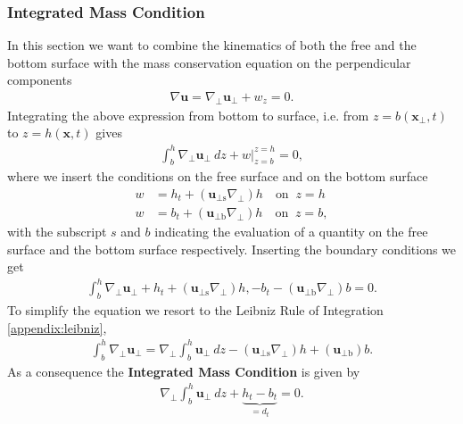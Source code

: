 \subsubsection{Integrated Mass Condition}
In this section we want to combine the kinematics of both the free and the
bottom surface with the mass conservation equation on the perpendicular
components
\begin{align}
    \nabla \mathbf{u} = \nabla_\perp \mathbf{u}_\perp + w_z = 0 .
\end{align}
Integrating the above expression from bottom to surface, i.e. from
$z=b(\mathbf{x}_\perp,t)$ to $z = h (\mathbf{x},t)$ gives
\begin{align}
    \int_b^h \nabla_\perp \mathbf{u}_\perp\ dz + w\bigg|_{z=b}^{z=h} = 0,
\end{align}
where we insert the conditions on the free surface and on the bottom surface
\begin{align}
    w &= h_t + (\mathbf{u}_{\perp \text{s}} \nabla_\perp) h \quad
    \text{on}\;\; z = h\\
    w &= b_t + (\mathbf{u}_{\perp \text{b}} \nabla_\perp) h \quad
    \text{on}\;\; z =b,
\end{align}
with the subscript $s$ and $b$ indicating the evaluation of a quantity
on the free surface and the bottom surface respectively. Inserting the
boundary conditions we get
\begin{align}
    \int_b^h \nabla_\perp \mathbf{u}_\perp
    + h_t + (\mathbf{u}_{\perp \text{s}} \nabla_\perp) h,
    - b_t - (\mathbf{u}_{\perp \text{b}} \nabla_\perp) b= 0.
\end{align}
To simplify the equation we resort to the Leibniz Rule of Integration
\ref{appendix:leibniz},
\begin{align}
     \int_b^h \nabla_\perp\mathbf{u}_\perp =
    \nabla_\perp \int_b^h \mathbf{u}_\perp\ dz - (\mathbf{u}_{\perp \text{s}}
    \nabla_\perp)h + (\mathbf{u}_{\perp \text{b}})b.
\end{align}
As a consequence the \textbf{Integrated Mass Condition} is given by
\begin{align}
    \nabla_\perp \int_b^h \mathbf{u}_\perp\ dz  + \underbrace{h_t -
    b_t}_{=d_t} = 0.
\end{align}
